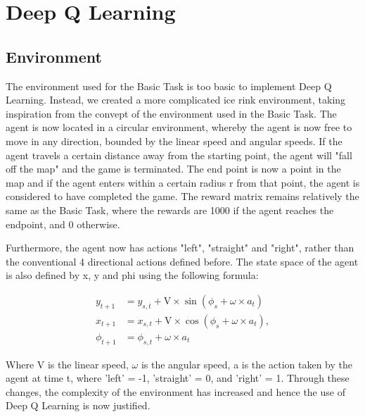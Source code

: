 \renewcommand{\thesection}{Advanced Task}
\section{Deep Q Learning}
\subsection{Environment}
The environment used for the Basic Task is too basic to implement Deep Q Learning. Instead, we created a more complicated ice rink environment, taking inspiration from the convept of the environment used in the Basic Task. The agent is now located in a circular environment, whereby the agent is now free to move in any direction, bounded by the linear speed and angular speeds.  If the agent travels a certain distance away from the starting point, the agent will "fall off the map" and the game is terminated. The end point is now a point in the map and if the agent enters within a certain radius r from that point, the agent is considered to have completed the game. The reward matrix remains relatively the same as the Basic Task, where the rewards are 1000 if the agent reaches the endpoint, and 0 otherwise.

Furthermore, the agent now has actions "left", "straight" and "right", rather than the conventional 4 directional actions defined before. The state space of the agent is also defined by x, y and phi using the following formula:

\begin{align}
    y_{t+1} &= y_{s,t} + \text{V} \times \sin(\phi_s + \omega \times a_t) \label{something} \\
    x_{t+1} &= x_{s,t} + \text{V} \times \cos(\phi_s + \omega \times a_t), \\
    \phi_{t+1} &= \phi_{s,t} + \omega \times a_t
\end{align}

Where V is the linear speed, $\omega$ is the angular speed, a is the action taken by the agent at time t, where 'left' = -1, 'straight' = 0, and 'right' = 1. Through these changes, the complexity of the environment has increased and hence the use of Deep Q Learning is now justified.

